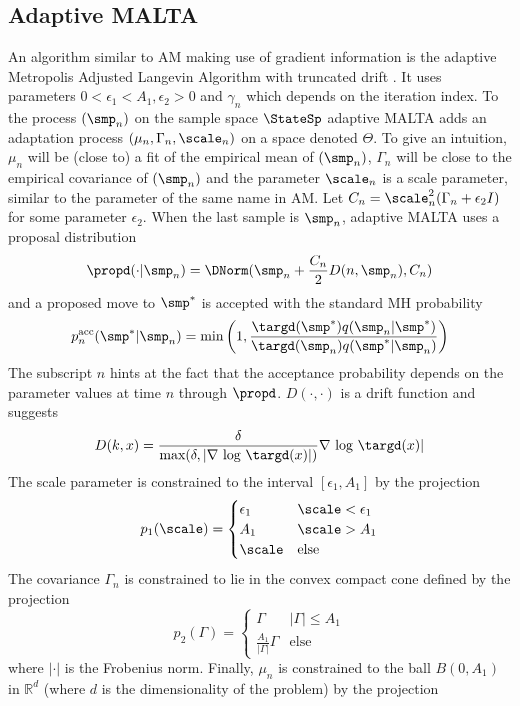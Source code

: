 \subsection{Adaptive MALTA}
An algorithm similar to AM making use of gradient information is the adaptive Metropolis Adjusted Langevin Algorithm with truncated drift \citep[adapt. MALTA, ][]{Atchade2006}. It uses parameters $0 < \epsilon_1 <A_1, \epsilon_2 >0$ and $\gamma_n$ which depends on the iteration index. To the process $(\smp_n)$ on the sample space $\StateSp$ adaptive MALTA adds an adaptation process $(\mu_n, \Gamma_n, \scale_n)$ on a space denoted $\Theta$. To give an intuition, $\mu_n$ will be (close to) a fit of the empirical mean of $(\smp_n)$, $\Gamma_n$ will be close to the empirical covariance of $(\smp_n)$ and the parameter $\scale_n$ is a scale parameter, similar to the parameter of the same name in AM. Let $C_n = \scale^2_n(\Gamma_n+\epsilon_2 I)$ for some parameter $\epsilon_2$. When the last sample is $\smp_n$, adaptive MALTA uses a proposal distribution
$$\propd(\cdot| \smp_n) = \DNorm(\smp_{n} + \frac{C_n}{2} D(n, \smp_{n}), C_n)$$
and a proposed move to $\smp^*$ is accepted with the standard MH probability
$$p_n^\textrm{acc}(\smp^*|\smp_n) = \textrm{min}\left(1, \frac{\targd(\smp^*)q(\smp_n|\smp^*)}{\targd(\smp_n)q(\smp^*|\smp_n)} \right)$$
The subscript $n$ hints at the fact that the acceptance probability depends on the parameter values at time $n$ through $\propd$.
 $D(\cdot, \cdot)$ is a drift function and \cite{Atchade2006} suggests
$$D(k, x) = \frac{\delta}{\textrm{max}(\delta, |\nabla~\textrm{log}~\targd(x)|)}\nabla~\textrm{log}~\targd(x)|$$
The scale parameter is constrained to the interval $[\epsilon_1,A_1]$ by the projection
\begin{equation*}
p_1(\scale) = 
\begin{cases}
\epsilon_1 & \scale <\epsilon_1 \\
A_1 & \scale > A_1 \\
\scale & \textrm{else}
 \end{cases}
 \end{equation*}
The covariance $\Gamma_n$ is constrained to lie in the convex compact cone defined by the projection
\begin{equation*}
p_2(\Gamma) = \begin{cases}\Gamma &|\Gamma| \leq A_1 \\ 
 \frac{A_1}{|\Gamma|}\Gamma &\textrm{else}
 \end{cases}
 \end{equation*}
where $|\cdot|$ is the Frobenius norm. Finally, $\mu_n$ is constrained to the ball $B(0,A_1)$ in $\mathbb{R}^d$ (where $d$ is the dimensionality of the problem) by the projection
